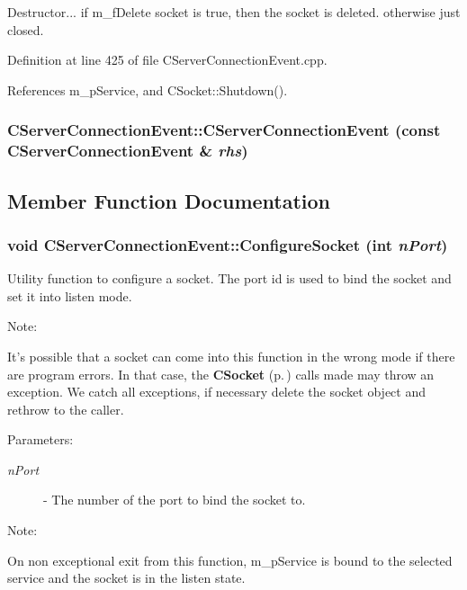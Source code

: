 Destructor... if m\_\-f\-Delete socket is true, then the socket is deleted. otherwise just closed. 

Definition at line 425 of file CServer\-Connection\-Event.cpp.

References m\_\-p\-Service, and CSocket::Shutdown().
\subsubsection{\setlength{\rightskip}{0pt plus 5cm}CServer\-Connection\-Event::CServer\-Connection\-Event (const CServer\-Connection\-Event \& {\em rhs})\hspace{0.3cm}{\tt  [private]}}\label{classCServerConnectionEvent_c0}




\subsection{Member Function Documentation}
\subsubsection{\setlength{\rightskip}{0pt plus 5cm}void CServer\-Connection\-Event::Configure\-Socket (int {\em n\-Port})\hspace{0.3cm}{\tt  [protected]}}\label{classCServerConnectionEvent_b3}


Utility function to configure a socket. The port id is  used to bind the socket and set it into listen mode.

\begin{Desc}
\item[Note: ]\par
It's possible that a socket can come into this function in the wrong mode if there are program errors. In that case, the {\bf CSocket} {\rm (p.\,\pageref{classCSocket})} calls made may throw an exception. We catch all exceptions, if necessary delete the socket object and rethrow to the caller.\end{Desc}
\begin{Desc}
\item[Parameters: ]\par
\begin{description}
\item[{\em 
n\-Port}]- The number of the port to bind the socket to.\end{description}
\end{Desc}
\begin{Desc}
\item[Note: ]\par
On non exceptional exit from this function, m\_\-p\-Service is bound to the selected service and the socket is in the listen state. \end{Desc}


